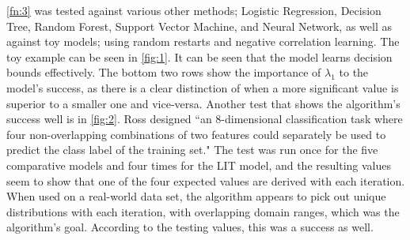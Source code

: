 \documentclass[twoside,11pt]{article}
\begin{document}
\cref{fn:3} was tested against various other methods; Logistic Regression, Decision Tree, Random Forest, Support Vector Machine, and Neural Network, as well as against toy models; using random restarts and negative correlation learning. The toy example can be seen in \cref{fig:1}. It can be seen that the model learns decision bounds effectively. The bottom two rows show the importance of $\lambda_1$ to the model's success, as there is a clear distinction of when a more significant value is superior to a smaller one and vice-versa. Another test that shows the algorithm's success well is in \cref{fig:2}. Ross designed ``an 8-dimensional classification task where four non-overlapping combinations of two features could separately be used to predict the class label of the training set." The test was run once for the five comparative models and four times for the LIT model, and the resulting values seem to show that one of the four expected values are derived with each iteration. When used on a real-world data set, the algorithm appears to pick out unique distributions with each iteration, with overlapping domain ranges, which was the algorithm's goal. According to the testing values, this was a success as well. 
\end{document}

